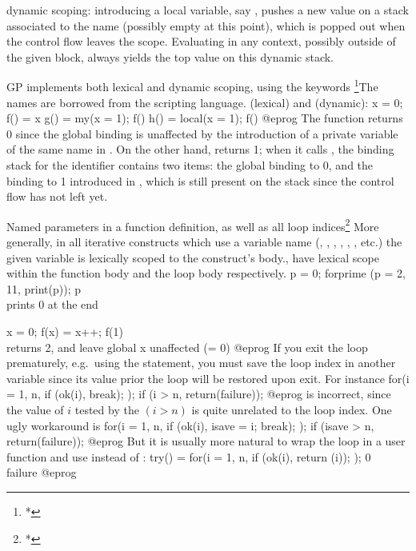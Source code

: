 \item{} dynamic scoping: introducing a local variable,
say , pushes a new value on a stack associated to the name 
(possibly empty at this point), which is popped out when the control flow
leaves the scope. Evaluating  in any context, possibly outside of the
given block, always yields the top value on this dynamic stack.

GP implements both lexical and dynamic scoping, using the keywords%
\footnote{*}{The names are borrowed from the  scripting language.}
 (lexical) and  (dynamic):
\bprog
  x = 0;
  f() = x
  g() =    my(x = 1); f()
  h() = local(x = 1); f()
@eprog\noindent
The function  returns 0 since the global  binding
is unaffected by the introduction of a private variable of the same name in
. On the other hand,  returns 1; when it calls , the
binding stack for the  identifier contains two items: the global
binding to 0, and the binding to 1 introduced in , which is still
present on the stack since the control flow has not left  yet.


Named parameters in a function definition, as well as all loop
indices\footnote{*}{
More generally, in all iterative constructs which use a variable name
(, , , , ,
, etc.) the given variable is lexically scoped to the construct's
body.},
have lexical scope within the function body and the loop body respectively.
\bprog
p = 0;
forprime (p = 2, 11, print(p)); p   \\ prints 0 at the end

x = 0;
f(x) = x++;
f(1)  \\ returns 2, and leave global x unaffected (= 0)
@eprog\noindent
If you exit the loop prematurely, e.g.~using the  statement, you
must save the loop index in another variable since its value prior the loop
will be restored upon exit. For instance
\bprog
  for(i = 1, n,
    if (ok(i), break);
  );
  if (i > n, return(failure));
@eprog\noindent
is incorrect, since the value of $i$ tested by the $(i > n)$ is quite
unrelated to the loop index. One ugly workaround is
\bprog
  for(i = 1, n,
    if (ok(i), isave = i; break);
  );
  if (isave > n, return(failure));
@eprog\noindent
But it is usually more natural to wrap the loop in a user function
and use  instead of :
\bprog
try() =
{
  for(i = 1, n,
    if (ok(i), return (i));
  );
  0 \\ failure
}
@eprog

